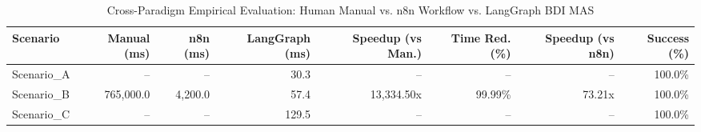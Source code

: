 \begin{table}[htbp]
\centering
\caption{Cross-Paradigm Empirical Evaluation: Human Manual vs. n8n Workflow vs. LangGraph BDI MAS}
\label{tab:empirical_evaluation}
\begin{tabular}{lrrrrrrr}
\toprule
\textbf{Scenario} & \textbf{Manual (ms)} & \textbf{n8n (ms)} & \textbf{LangGraph (ms)} & \textbf{Speedup (vs Man.)} & \textbf{Time Red. (\%)} & \textbf{Speedup (vs n8n)} & \textbf{Success (\%)} \\
\midrule
Scenario\_A & -- & -- & 30.3 & -- & -- & -- & 100.0\% \\
Scenario\_B & 765,000.0 & 4,200.0 & 57.4 & 13,334.50x & 99.99\% & 73.21x & 100.0\% \\
Scenario\_C & -- & -- & 129.5 & -- & -- & -- & 100.0\% \\
\bottomrule
\end{tabular}
\end{table}